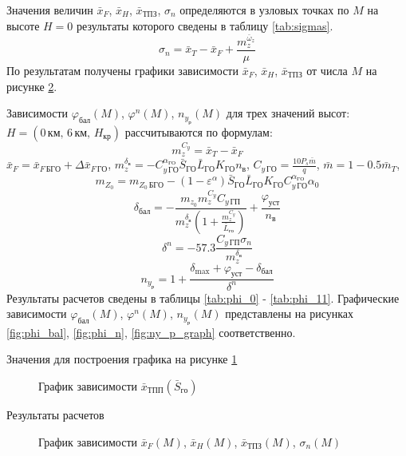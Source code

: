 Значения величин $\bar{x}_F$, $\bar{x}_H$, $\bar{x}_{ТПЗ}$, $\sigma_n$ определяются в
узловых точках по $M$ на высоте $H=0$ результаты которого сведены в таблицу
\ref{tab:sigmas}. 
\[
    \sigma_n = \bar{x}_{T} - \bar{x}_{F} + \frac{m_z^{\bar{\omega}_z}}{\mu}
\]
По результатам получены графики зависимости $\bar{x}_F$, $\bar{x}_H$,
$\bar{x}_{ТПЗ}$ от числа $M$ на рисунке \ref{fig:xis_sigma}.

Зависимости $\varphi_{бал}(M)$, $\varphi^n(M)$, $n_{y_р}(M)$ для трех значений
высот: $H=(0 \, км,\, 6 \, км,\, H_{кр})$ рассчитываются по формулам:
\[
    m_z^{C_y} = \bar{x}_T - \bar{x}_F
\]
$\bar{x}_{F} = \bar{x}_{F\, БГО} + \Delta \bar{x}_{F\, ГО}$, $m_z^{\delta_в} = 
-C_{y\, {ГО}}^{\alpha_{ГО}} \bar{S}_{ГО} \bar{L}_{ГО} K_{ГО} n_в$, $C_{y\, {ГО}}
= \frac{10 P_s \bar{m}}{q}$, $\bar{m} = 1 - 0.5 \bar{m}_{T}$,
\[
    m_{Z_0} = m_{Z_0\, БГО} - 
    (1-\varepsilon^\alpha)\bar{S}_{ГО} \bar{L}_{ГО} K_{ГО} C_{y\,{ГО}}^{\alpha_{ГО}}
    \alpha_0
\]
\[
    \delta_{бал}  = - \frac{m_{z_0} m_z^{C_y} C_{y\, {ГП}}}{ m_z^{\delta_в}
    \left(1 + \frac{m_z^{C_y}}{\bar{L}_{го}}\right)} + \frac{\varphi_{уст}}{n_в}
\]
\[
    \delta^n = -57.3 \frac{C_{y\, ГП} \sigma_n}{ m_z^{\delta_в}}
\]
\[
    n_{y_р} = 1 + \frac{\delta_{\max} + \varphi_{уст} - \delta_{бал}}{\delta^n}
\]
Результаты расчетов сведены в таблицы \ref{tab:phi_0} - \ref{tab:phi_11}.
Графические зависимости $\varphi_{бал}(M)$, $\varphi^n(M)$, $n_{y_{р}}(M)$
представлены на рисунках \ref{fig:phi_bal}, \ref{fig:phi_n},
\ref{fig:ny_p_graph} соответственно.

\begin{table}[H]
    \centering
    \caption{Значения для построения графика на рисунке \ref{fig:xTP}}
    \label{tab:otn_S_go}
    
\end{table}
\begin{figure}[H]
\centering
\resizebox{.79\linewidth}{!}{}
\caption{График зависимости $\bar{x}_{ТПП}(\bar{S}_{го})$} 
\label{fig:xTP}
\end{figure}

\begin{table}[H]
    \centering
    \caption{Результаты расчетов}
    \label{tab:sigmas}
    
\end{table}

\begin{figure}[H]
\centering
\resizebox{.79\linewidth}{!}{}
\caption{График зависимости $\bar{x}_{F}(M)$, $\bar{x}_{H}(M)$, $\bar{x}_{ТПЗ}(M)$, $\sigma_{n}(M)$}
\label{fig:xis_sigma}
\end{figure}


